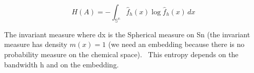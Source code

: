 \[ H(A) = -\int_\mathbb{{S}^n}  \hat{f}_h(x)\log  \hat{f}_h(x)\,dx  \]



The invariant measure where dx is the Spherical measure on Sn (the invariant measure has density $m(x)=1$ (we need an embedding because there is no probability measure on the chemical space). 
This entropy depends on the bandwidth h and on the embedding.
